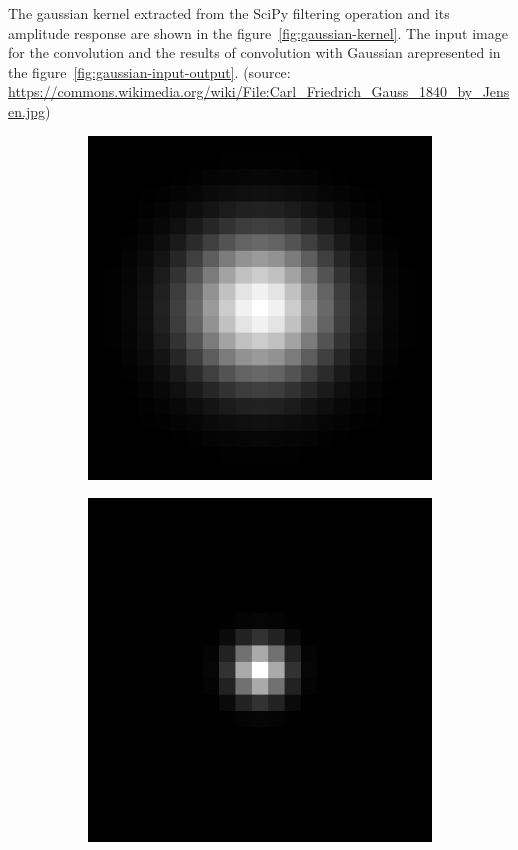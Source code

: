 \documentclass[]{article}
\begin{document}
The gaussian kernel extracted from the SciPy filtering operation and its
amplitude response are shown in the figure~\ref{fig:gaussian-kernel}. The input
image for the convolution and the results of convolution with Gaussian
arepresented in the figure~\ref{fig:gaussian-input-output}. (source:
\url{https://commons.wikimedia.org/wiki/File:Carl_Friedrich_Gauss_1840_by_Jensen.jpg})
\begin{figure}
  \centering
    \begin{subfigure}[t]{0.49\textwidth}
      \centering
      \includegraphics[width=0.99\linewidth]{kernel.png}
    \end{subfigure}
    \begin{subfigure}[t]{0.49\textwidth}
      \centering
      \includegraphics[width=0.99\linewidth]{freq.png}

\end{subfigure}
\end{figure}
\end{document}
